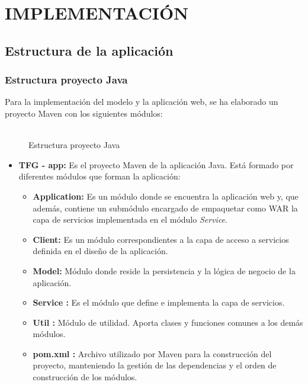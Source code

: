 \chapter[Implementación]{
  \label{chp:implementacion}
  IMPLEMENTACIÓN
}
\thispagestyle{numberingStyle}
\pagestyle{numberingStyle}



\section{Estructura de la aplicación}
\subsection{Estructura proyecto Java}
Para la implementación del modelo y la aplicación web, se ha elaborado un proyecto Maven con los siguientes módulos:
\\
\\

\begin{figure}[H]
\centering
{}
\caption{Estructura proyecto Java}
\end{figure}


\begin{itemize}
	\item \textbf{TFG - app: } Es el proyecto Maven de la aplicación Java. Está formado por diferentes módulos que forman la aplicación:
	\begin{itemize}
		\item \textbf{Application: } Es un módulo donde se encuentra la aplicación web y, que además, contiene un submódulo encargado de empaquetar como WAR la capa de servicios implementada en el módulo \textit{Service}.
		\item \textbf{Client: } Es un módulo correspondientes a la capa de acceso a servicios definida en el diseño de la aplicación. 
		\item \textbf{Model: } Módulo donde reside la persistencia y la lógica de negocio de la aplicación.
		\item \textbf{Service : } Es el módulo que define e implementa la capa de servicios.
		\item \textbf{Util : } Módulo de utilidad. Aporta clases y funciones comunes a los demás módulos.
		\item \textbf{pom.xml : } Archivo utilizado por Maven para la construcción del proyecto, manteniendo la gestión de las dependencias y el orden de construcción de los módulos.
	\end{itemize}
\end{itemize}

